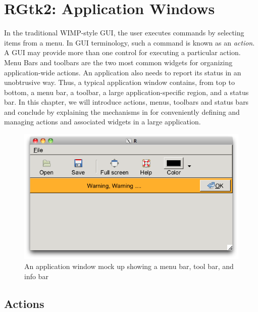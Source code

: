 




\chapter{RGtk2: Application Windows}
\label{sec:RGtk2-menus}


In the traditional WIMP-style GUI, the user executes commands by
selecting items from a menu. In GUI terminology, such a command is
known as an \textit{action}. A GUI may provide more than one control
for executing a particular action. Menu Bars and toolbars are the two
most common widgets for organizing application-wide actions. An
application also needs to report its status in an unobtrusive
way. Thus, a typical application window contains, from top to bottom, 
a menu bar, a toolbar, a large application-specific region, and a
status bar.  In this chapter, we will introduce actions, menus,
toolbars and status bars and conclude by explaining the mechanisms in
\GTK\/ for conveniently defining and managing actions and associated
widgets in a large application.

\begin{figure}
  \centering
  \includegraphics[width=.7\textwidth]{ex-RGtk2-action-items-infobar}
  \caption{An application window mock up showing a menu bar, tool bar,
  and info bar}
  \label{fig:RGtk2-action-items-infobar}
\end{figure}


\section{Actions}
\label{sec:RGtk2:actions}


